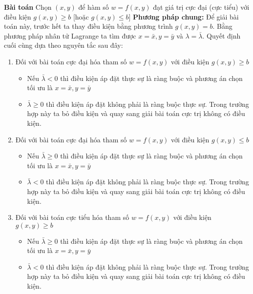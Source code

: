 \documentclass{article}
\begin{document}
\begin{enumerate}
        \textbf{Bài toán}
        Chọn $(x,y)$ để hàm số $w = f(x,y)$ đạt giá trị cực đại (cực tiểu) với 
        điều kiện $g(x,y) \geq b$ [hoặc $ g(x,y) \leq b$] \newline 
        \textbf{Phương pháp chung:} Để giải bài toán này, trước hết ta thay điều 
        kiện bằng phương trình $g(x,y) = b$. Bằng phương pháp nhân tử Lagrange ta
        tìm được $x=\bar{x}, y = \bar{y}$ và $\lambda = \bar{\lambda}$.
        Quyết định cuối cùng dựa theo nguyên tắc sau đây: \newline 
        \begin{enumerate}
            \item Đối với bài toán cực đại hóa tham số $w = f(x, y)$ với điều kiện $g(x,y) \geq b$
            \begin{itemize}
                \item Nếu $\bar{\lambda} < 0$ thì điều kiện áp đặt thực sự là ràng 
                buộc và phương án chọn tối ưu là $x=\bar{x}, y = \bar{y}$
                \item $\bar{\lambda} \geq 0$ thì điều kiện áp đặt không phải là  ràng 
                buộc thực sự. Trong trường hợp này ta bỏ điều kiện và quay sang giải bài toán 
                cực trị không có điều kiện.
            \end{itemize}

            \item Đối với bài toán cực đại hóa tham số $w = f(x, y)$ với điều kiện $g(x,y) \leq b$ 
            \begin{itemize}
                \item Nếu $\bar{\lambda} \geq 0$ thì điều kiện áp đặt thực sự là ràng 
                buộc và phương án chọn tối ưu là $x=\bar{x}, y = \bar{y}$
                \item $\bar{\lambda} < 0$ thì điều kiện áp đặt không phải là ràng 
                buộc thực sự. Trong trường hợp này ta bỏ điều kiện và quay sang giải bài toán 
                cực trị không có điều kiện.
            \end{itemize}

            \item Đối với bài toán cực tiểu hóa tham số $w = f(x, y)$ với điều kiện $g(x,y) \geq b$ 
            \begin{itemize}
                \item Nếu $\bar{\lambda} \geq 0$ thì điều kiện áp đặt thực sự là ràng 
                buộc và phương án chọn tối ưu là $x=\bar{x}, y = \bar{y}$
                \item $\bar{\lambda} < 0$ thì điều kiện áp đặt không phải là ràng 
                buộc thực sự. Trong trường hợp này ta bỏ điều kiện và quay sang giải bài toán 
                cực trị không có điều kiện.
            \end{itemize}


\end{enumerate}
\end{enumerate}
\end{document}
